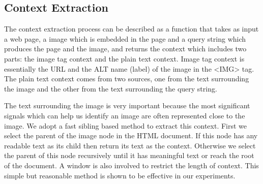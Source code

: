 \subsection{Context Extraction}
The context extraction process can be described as a function
that takes as input a web page, a image which is embedded in the page
and a query string which produces the page and the image, 
and returns the context which includes two parts:
the image tag context and the plain text context.
Image tag context is essentially the URL and the
ALT name (label) of the image in the <IMG> tag. 
The plain text context comes from two sources, 
one from the text surrounding the image
and the other from the text surrounding the query string.




The text surrounding the image is very important because the most
significant signals which can help us identify an image are often 
represented close to the image. 
We adopt a fast sibling based method to extract this context.
First we select the parent of the image node in the HTML document.
If this node has any readable text as its child then return 
its text as the context.  Otherwise we select the parent of this node
recursively until it has meaningful text or reach the root of the document.
A window is also involved to restrict the length of context.
This simple but reasonable method is shown to be effective in our experiments.

